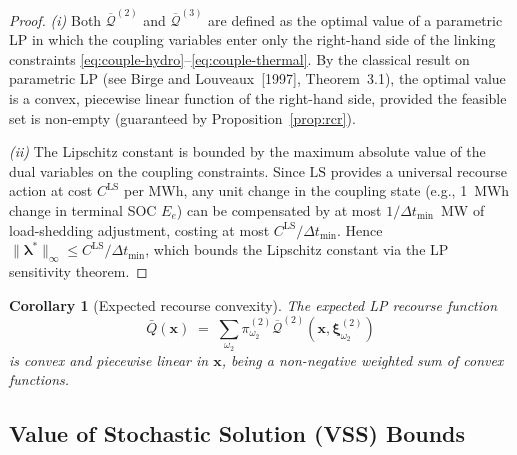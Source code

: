 \documentclass[11pt]{article}
\newcommand{\LS}{\mathrm{LS}}
\newtheorem{corollary}{Corollary}
\begin{document}
\begin{proof}
\emph{(i)} Both $\overline{\mathcal{Q}}^{(2)}$ and
$\overline{\mathcal{Q}}^{(3)}$ are defined as the optimal value of
a parametric LP in which the coupling variables enter only the
right-hand side of the linking constraints
\eqref{eq:couple-hydro}--\eqref{eq:couple-thermal}. By the classical
result on parametric LP (see Birge and Louveaux~[1997], Theorem~3.1),
the optimal value is a convex, piecewise linear function of the
right-hand side, provided the feasible set is non-empty
(guaranteed by Proposition~\ref{prop:rcr}).

\emph{(ii)} The Lipschitz constant is bounded by the maximum absolute
value of the dual variables on the coupling constraints. Since $\LS$
provides a universal recourse action at cost $C^{\mathrm{LS}}$ per MWh,
any unit change in the coupling state (e.g., 1~MWh change in terminal
SOC $E_e$) can be compensated by at most $1/\Delta t_{\min}$~MW of
load-shedding adjustment, costing at most
$C^{\mathrm{LS}}/\Delta t_{\min}$. Hence
$\|\boldsymbol{\lambda}^*\|_\infty \leq
C^{\mathrm{LS}}/\Delta t_{\min}$, which bounds the Lipschitz constant
via the LP sensitivity theorem.
\end{proof}

\begin{corollary}[Expected recourse convexity]\label{cor:exp-convex}
The expected LP recourse function
\[
  \bar{Q}(\mathbf{x}) \;=\;
  \sum_{\omega_2} \pi^{(2)}_{\omega_2}
  \overline{\mathcal{Q}}^{(2)}(\mathbf{x},
    \boldsymbol{\xi}^{(2)}_{\omega_2})
\]
is convex and piecewise linear in $\mathbf{x}$, being a
non-negative weighted sum of convex functions.
\end{corollary}

\subsection{Value of Stochastic Solution (VSS) Bounds}
\label{sec:vss-theory}
\end{document}
